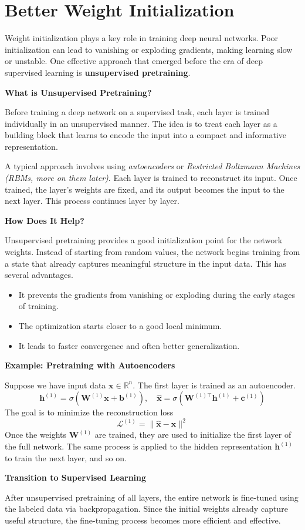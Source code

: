 \section{Better Weight Initialization}

Weight initialization plays a key role in training deep neural networks. Poor initialization can lead to vanishing or exploding gradients, making learning slow or unstable. One effective approach that emerged before the era of deep supervised learning is \textbf{unsupervised pretraining}.

\textbf{What is Unsupervised Pretraining?}

Before training a deep network on a supervised task, each layer is trained individually in an unsupervised manner. The idea is to treat each layer as a building block that learns to encode the input into a compact and informative representation.

A typical approach involves using \textit{autoencoders} or \textit{Restricted Boltzmann Machines (RBMs, more on them later)}. Each layer is trained to reconstruct its input. Once trained, the layer's weights are fixed, and its output becomes the input to the next layer. This process continues layer by layer.

\textbf{How Does It Help?}

Unsupervised pretraining provides a good initialization point for the network weights. Instead of starting from random values, the network begins training from a state that already captures meaningful structure in the input data. This has several advantages.
\begin{itemize}
    \item It prevents the gradients from vanishing or exploding during the early stages of training.
    \item The optimization starts closer to a good local minimum.
    \item It leads to faster convergence and often better generalization.
\end{itemize}

\textbf{Example: Pretraining with Autoencoders}

Suppose we have input data $\boldsymbol{x} \in \mathbb{R}^n$. The first layer is trained as an autoencoder.
\[
\boldsymbol{h}^{(1)} = \sigma(\boldsymbol{W}^{(1)} \boldsymbol{x} + \boldsymbol{b}^{(1)}), \quad \hat{\boldsymbol{x}} = \sigma(\boldsymbol{W}^{(1)\top} \boldsymbol{h}^{(1)} + \boldsymbol{c}^{(1)})
\]
The goal is to minimize the reconstruction loss
\[
\mathcal{L}^{(1)} = \| \hat{\boldsymbol{x}} - \boldsymbol{x} \|^2
\]
Once the weights $\boldsymbol{W}^{(1)}$ are trained, they are used to initialize the first layer of the full network. The same process is applied to the hidden representation $\boldsymbol{h}^{(1)}$ to train the next layer, and so on.

\textbf{Transition to Supervised Learning}

After unsupervised pretraining of all layers, the entire network is fine-tuned using the labeled data via backpropagation. Since the initial weights already capture useful structure, the fine-tuning process becomes more efficient and effective.


